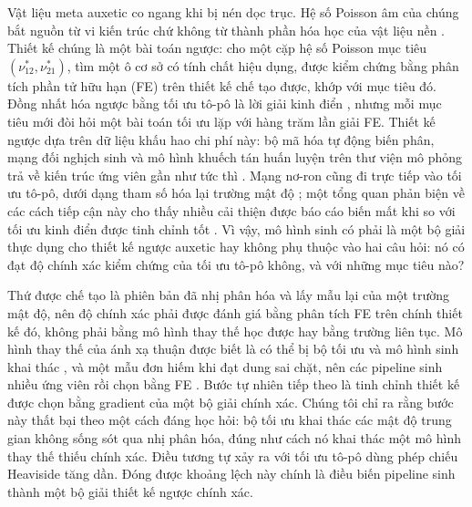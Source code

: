 \documentclass[a4paper,11pt]{article}
\newcommand{\nuot}{\nu_{12}}
\newcommand{\nuto}{\nu_{21}}
\begin{document}
Vật liệu meta auxetic co ngang khi bị nén dọc trục. Hệ số Poisson âm của
chúng bắt nguồn từ vi kiến trúc chứ không từ thành phần hóa học của vật liệu
nền \citep{lakes1987foam,evans2000auxetic,bertoldi2017flexible}. Thiết kế
chúng là một bài toán ngược: cho một cặp hệ số Poisson mục tiêu
$(\nuot^{*},\nuto^{*})$, tìm một ô cơ sở có tính chất hiệu dụng, được kiểm
chứng bằng phân tích phần tử hữu hạn (FE) trên thiết kế chế tạo được, khớp
với mục tiêu đó. Đồng nhất hóa ngược bằng tối ưu tô-pô là lời giải kinh điển
\citep{sigmund1994materials,larsen1997design,bendsoe2003topology}, nhưng mỗi
mục tiêu mới đòi hỏi một bài toán tối ưu lặp với hàng trăm lần giải FE. Thiết
kế ngược dựa trên dữ liệu khấu hao chi phí này: bộ mã hóa tự động biến phân,
mạng đối nghịch sinh và mô hình khuếch tán huấn luyện trên thư viện mô phỏng
trả về kiến trúc ứng viên gần như tức thì
\citep{wang2020deep,mao2020gan,kumar2020spinodoid,bastek2022inverting,kollmann2020deep,zheng2021controllable,pahlavani2024deep,bastek2023diffusion}.
Mạng nơ-ron cũng đi trực tiếp vào tối ưu tô-pô, dưới dạng tham số hóa lại
trường mật độ \citep{hoyer2019neural,chandrasekhar2021tounn}; một tổng quan
phản biện về các cách tiếp cận này cho thấy nhiều cải thiện được báo cáo biến
mất khi so với tối ưu kinh điển được tinh chỉnh tốt \citep{woldseth2022use}.
Vì vậy, mô hình sinh có phải là một bộ giải thực dụng cho thiết kế ngược
auxetic hay không phụ thuộc vào hai câu hỏi: nó có đạt độ chính xác kiểm
chứng của tối ưu tô-pô không, và với những mục tiêu nào?

Thứ được chế tạo là phiên bản đã nhị phân hóa và lấy mẫu lại của một trường
mật độ, nên độ chính xác phải được đánh giá bằng phân tích FE trên chính
thiết kế đó, không phải bằng mô hình thay thế học được hay bằng trường liên
tục. Mô hình thay thế của ánh xạ thuận được biết là có thể bị bộ tối ưu và
mô hình sinh khai thác \citep{trabucco2021coms}, và một mẫu đơn hiếm khi đạt
dung sai chặt, nên các pipeline sinh nhiều ứng viên rồi chọn bằng FE
\citep{pahlavani2024deep}. Bước tự nhiên tiếp theo là tinh chỉnh thiết kế
được chọn bằng gradient của một bộ giải chính xác. Chúng tôi chỉ ra rằng bước
này thất bại theo một cách đáng học hỏi: bộ tối ưu khai thác các mật độ trung
gian không sống sót qua nhị phân hóa, đúng như cách nó khai thác một mô hình
thay thế thiếu chính xác. Điều tương tự xảy ra với tối ưu tô-pô dùng phép
chiếu Heaviside tăng dần. Đóng được khoảng lệch này chính là điều biến
pipeline sinh thành một bộ giải thiết kế ngược chính xác.
\end{document}
